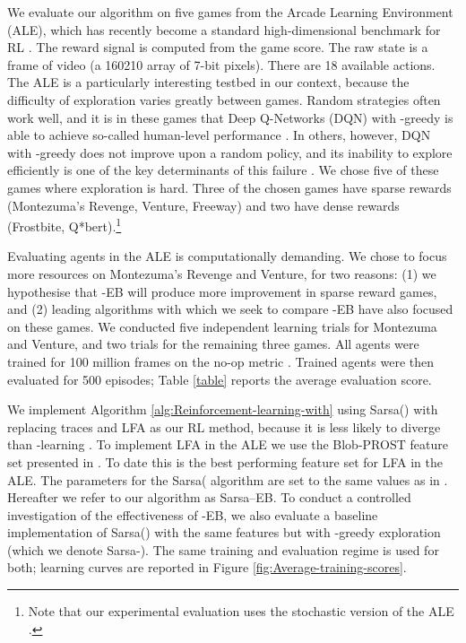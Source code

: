 \documentclass{article}
\theoremstyle{definition}
\theoremstyle{definition}
\theoremstyle{plain}
\theoremstyle{plain}
\theoremstyle{plain}
\begin{document}
We evaluate our algorithm on five games from the Arcade Learning Environment
(ALE), which has recently become a standard high-dimensional benchmark
for RL \cite{BNVB:2013ale}. The reward signal is computed from the
game score. The raw state is a frame of video (a 160210 array
of 7-bit pixels). There are 18 available actions. The ALE is a particularly
interesting testbed in our context, because the difficulty of exploration
varies greatly between games. Random strategies often work well, and
it is in these games that Deep Q-Networks (DQN) with -greedy
is able to achieve so-called human-level performance \cite{Mnih2015}.
In others, however, DQN with -greedy does not improve upon
a random policy, and its inability to explore efficiently is one of
the key determinants of this failure \cite{DBLP:journals/corr/OsbandBPR16}.
We chose five of these games where exploration is hard. Three of the
chosen games have sparse rewards (Montezuma's Revenge, Venture, Freeway)
and two have dense rewards (Frostbite, Q{*}bert).\footnote{Note that our experimental evaluation uses the stochastic version
of the ALE \cite{BNVB:2013ale}.} 

Evaluating agents in the ALE is computationally demanding. We chose
to focus more resources on Montezuma's Revenge and Venture, for two
reasons: (1) we hypothesise that -EB will produce more improvement
in sparse reward games, and (2) leading algorithms with which we seek
to compare -EB have also focused on these games. We conducted
five independent learning trials for Montezuma and Venture, and two
trials for the remaining three games. All agents were trained for
100 million frames on the no-op metric \cite{BNVB:2013ale}. Trained
agents were then evaluated for 500 episodes; Table \ref{table} reports
the average evaluation score.

We implement Algorithm \ref{alg:Reinforcement-learning-with} using
Sarsa() with replacing traces and LFA as our RL method,
because it is less likely to diverge than -learning \cite{Sutton1998}.
To implement LFA in the ALE we use the Blob-PROST feature set presented
in \cite{LMTB:2015shallow}. To date this is the best performing feature
set for LFA in the ALE. The parameters for the Sarsa( algorithm
are set to the same values as in \cite{LMTB:2015shallow}. Hereafter
we refer to our algorithm as Sarsa--EB. To conduct a controlled
investigation of the effectiveness of -EB, we also evaluate
a baseline implementation of Sarsa() with the same features
but with -greedy exploration (which we denote Sarsa-).
The same training and evaluation regime is used for both; learning
curves are reported in Figure \ref{fig:Average-training-scores}. 
\end{document}
